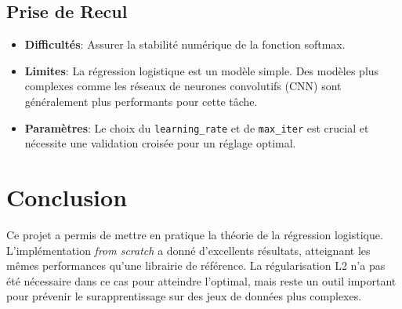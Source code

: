 \documentclass{article}
\begin{document}
\subsection{Prise de Recul}
\begin{itemize}
    \item \textbf{Difficultés}: Assurer la stabilité numérique de la fonction softmax.
    \item \textbf{Limites}: La régression logistique est un modèle simple. Des modèles plus complexes comme les réseaux de neurones convolutifs (CNN) sont généralement plus performants pour cette tâche.
    \item \textbf{Paramètres}: Le choix du \texttt{learning\_rate} et de \texttt{max\_iter} est crucial et nécessite une validation croisée pour un réglage optimal.
\end{itemize}

\section{Conclusion}

Ce projet a permis de mettre en pratique la théorie de la régression
logistique. L'implémentation \textit{from scratch} a donné d'excellents
résultats, atteignant les mêmes performances qu'une librairie de référence. La
régularisation L2 n'a pas été nécessaire dans ce cas pour atteindre l'optimal,
mais reste un outil important pour prévenir le surapprentissage sur des jeux de
données plus complexes.
\end{document}
